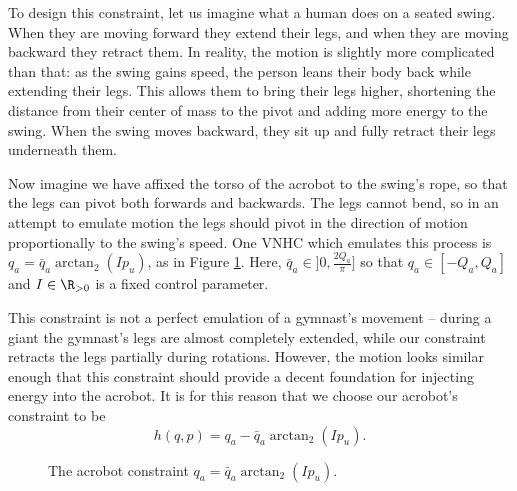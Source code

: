 To design this constraint, let us imagine what a human does on
a seated swing.
When they are moving forward they extend their legs, and when they are moving
backward they retract them. 
In reality, the motion is slightly more complicated than that:
as the swing gains speed, the person leans their body back while
extending their legs.
This allows them to bring their legs higher, shortening the distance
from their center of mass to the pivot and adding more energy to the swing.
When the swing moves backward, they sit up and fully retract their legs
underneath them.

Now imagine we have affixed the torso of the acrobot to the swing's rope, so 
that the legs can pivot both forwards and backwards.
The legs cannot bend, so in an attempt to emulate motion the legs should pivot
in the direction of motion proportionally to the swing's speed.
One VNHC which emulates this process is \(q_a = \bar{q}_a\arctan_2( I p_u)\), as
in Figure \ref{fig:qa-arctan}.
Here, \(\bar{q}_a \in ]0,\frac{2 Q_a}{\pi}]\) so that 
\(q_a \in [-Q_a, Q_a]\) and \(I \in \R_{>0}\) is a fixed control parameter.

This constraint is not a perfect emulation of a gymnast's movement -- during
a giant the gymnast's legs are almost completely extended, while our constraint
retracts the legs partially during rotations.
However, the motion looks similar enough that this constraint should provide a
decent foundation for injecting energy into the acrobot.
It is for this reason that we choose our acrobot's constraint to be
\begin{equation}\label{eqn:acrobot-constraint}
    h(q,p) = q_a - \bar{q}_a \arctan_2(I p_u)
    .
\end{equation}

\begin{figure}
    \centering
    
    \caption{The acrobot constraint \(q_a = \bar{q}_a \arctan_2(I p_u)\).}
    \label{fig:qa-arctan}
\end{figure}

